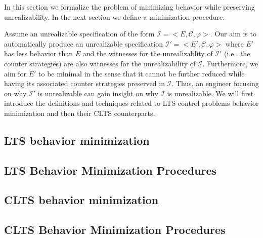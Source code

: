 
In this section we formalize the problem of minimizing behavior while preserving unrealizability. In the next section we define a minimization procedure.

Assume an unrealizable specification of the form $\mathcal{I} = <E, \mathcal{C}, \varphi>$. Our aim is to automatically produce an unrealizable specification $\mathcal{I'} = <E', \mathcal{C}, \varphi>$ where $E'$ has less behavior than $E$ and the witnesses for the unrealizablity of $\mathcal{I'}$ (i.e., the counter strategies) are also witnesses for the unrealizability of $\mathcal{I}$.  Furthermore, we aim for $E'$ to be minimal in the sense that it cannot be further reduced while having its associated counter strategies preserved in  $\mathcal{I}$.
Thus, an engineer focusing on why  $\mathcal{I'}$ is unrealizable can gain insight on why $\mathcal{I}$ is unrealizable. 
We will first introduce the definitions and techniques related to LTS control problems behavior minimization and then their CLTS counterparts.

\subsection{LTS behavior minimization}

\subsection{LTS Behavior Minimization Procedures}


\subsection{CLTS behavior minimization}

\subsection{CLTS Behavior Minimization Procedures}
